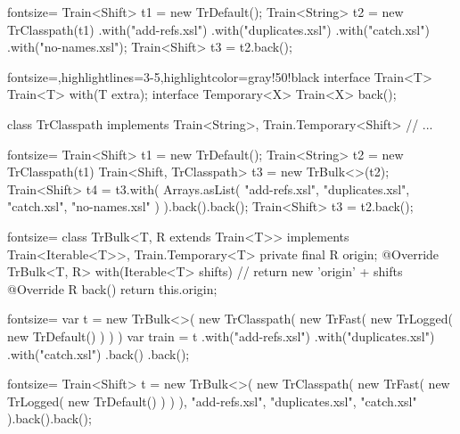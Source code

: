 \documentclass{article}
\begin{document}
\plush{}
\begin{pptWide}{2}
\begin{ffcode*}{fontsize=\footnotesize}
Train<Shift> t1 = new TrDefault();
Train<String> t2 = new TrClasspath(t1)
  .with("add-refs.xsl")
  .with("duplicates.xsl")
  .with("catch.xsl")
  .with("no-names.xsl");
Train<Shift> t3 = t2.back();
\end{ffcode*}
\columnbreak
\begin{ffcode*}{fontsize=\small,highlightlines={3-5},highlightcolor=gray!50!black}
interface Train<T> {
  Train<T> with(T extra);
  interface Temporary<X> {
    Train<X> back();
  }
}

class TrClasspath implements
  Train<String>,
  Train.Temporary<Shift> {
  // ...
}
\end{ffcode*}
\end{pptWide}

\plush{}
\begin{pptWide}{2}
\begin{ffcode*}{fontsize=\footnotesize}
Train<Shift> t1 = new TrDefault();
Train<String> t2 = new TrClasspath(t1)
Train<Shift, TrClasspath> t3 =
  new TrBulk<>(t2);
Train<Shift> t4 = t3.with(
  Arrays.asList(
    "add-refs.xsl",
    "duplicates.xsl",
    "catch.xsl",
    "no-names.xsl"
  )
).back().back();
Train<Shift> t3 = t2.back();
\end{ffcode*}
\columnbreak
\begin{ffcode*}{fontsize=\small}
class TrBulk<T, R extends Train<T>>
  implements Train<Iterable<T>>,
  Train.Temporary<T> {
  private final R origin;
  @Override
  TrBulk<T, R> with(Iterable<T> shifts) {
    // return new 'origin' + shifts
  }
  @Override
  R back() {
    return this.origin;
  }
}
\end{ffcode*}
\end{pptWide}

\plush{}
\begin{pptWide}{2}
\begin{ffcode*}{fontsize=\footnotesize}
var t = new TrBulk<>(
  new TrClasspath(
    new TrFast(
      new TrLogged(
        new TrDefault()
      )
    )
)
var train = t
  .with("add-refs.xsl")
  .with("duplicates.xsl")
  .with("catch.xsl")
  .back()
  .back();
\end{ffcode*}
\columnbreak
\begin{ffcode*}{fontsize=\small}
Train<Shift> t = new TrBulk<>(
  new TrClasspath(
    new TrFast(
      new TrLogged(
        new TrDefault()
      )
    )
  ),
  "add-refs.xsl",
  "duplicates.xsl",
  "catch.xsl"
).back().back();
\end{ffcode*}
\end{pptWide}
\end{document}
